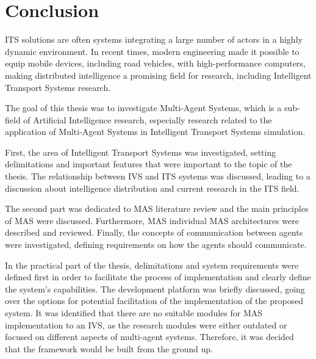 \documentclass[titlepage, 12pt]{article}
\begin{document}
















\clearpage

\section{Conclusion}

ITS solutions are often systems integrating a large number of 
actors in a highly dynamic environment. In recent times, modern engineering made it possible 
to equip mobile devices, including road vehicles, with high-performance computers, making 
distributed intelligence a promising field for research, including Intelligent Transport Systems 
research.

The goal of this thesis was to investigate Multi-Agent Systems, which is a sub-field of Artificial Intelligence 
research, especially research related to the application of Multi-Agent Systems in Intelligent Transport Systems 
simulation. 

First, the area of Intelligent Transport Systems was investigated, setting delimitations and important features 
that were important to the topic of the thesis. The relationship between IVS and ITS systems was discussed, leading 
to a discussion about intelligence distribution and current research in the ITS field. 

The second part was dedicated to MAS literature review and the main principles of MAS were discussed. Furthermore, MAS 
individual MAS architectures were described and reviewed. Finally, the concepts of communication between agents were investigated,
defining requirements on how the agents should communicate. 

In the practical part of the thesis, delimitations and system requirements were defined first in order to facilitate the 
process of implementation and clearly define the system's capabilities. The development platform was briefly discussed, 
going over the options for potential facilitation of the implementation of the proposed system. It was identified that 
there are no suitable modules for MAS implementation to an IVS, as the research modules were either outdated or focused on 
different aspects of multi-agent systems. Therefore, it was decided that the framework would be built from the ground up.
\end{document}
